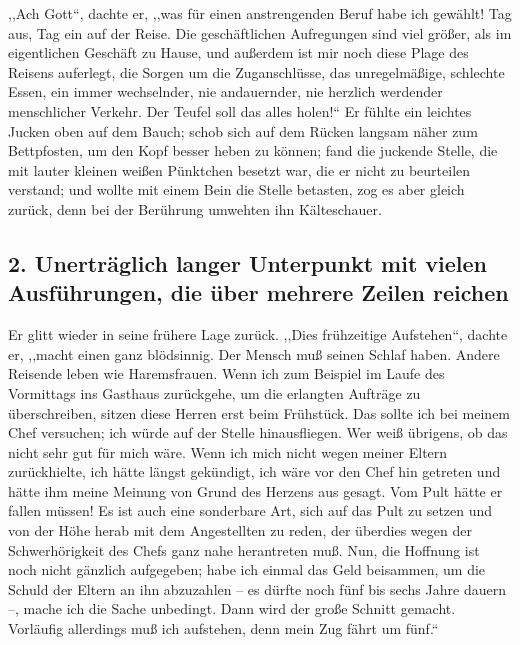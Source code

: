 \documentclass[]{zchinr}
\begin{document}
,,Ach Gott``, dachte er, ,,was für einen anstrengenden Beruf habe ich gewählt! Tag aus, Tag ein auf der Reise. Die geschäftlichen Aufregungen sind viel größer, als im eigentlichen Geschäft zu Hause, und außerdem ist mir noch diese Plage des Reisens auferlegt, die Sorgen um die Zuganschlüsse, das unregelmäßige, schlechte Essen, ein immer wechselnder, nie andauernder, nie herzlich werdender menschlicher Verkehr. Der Teufel soll das alles holen!`` Er fühlte ein leichtes Jucken oben auf dem Bauch; schob sich auf dem Rücken langsam näher zum Bettpfosten, um den Kopf besser heben zu können; fand die juckende Stelle, die mit lauter kleinen weißen Pünktchen besetzt war, die er nicht zu beurteilen verstand; und wollte mit einem Bein die Stelle betasten, zog es aber gleich zurück, denn bei der Berührung umwehten ihn Kälteschauer.

\subsection{2. Unerträglich langer Unterpunkt mit vielen Ausführungen, die über mehrere Zeilen reichen}

Er glitt wieder in seine frühere Lage zurück. ,,Dies frühzeitige Aufstehen``, dachte er, ,,macht einen ganz blödsinnig. Der Mensch muß seinen Schlaf haben. Andere Reisende leben wie Haremsfrauen. Wenn ich zum Beispiel im Laufe des Vormittags ins Gasthaus zurückgehe, um die erlangten Aufträge zu überschreiben, sitzen diese Herren erst beim Frühstück. Das sollte ich bei meinem Chef versuchen; ich würde auf der Stelle hinausfliegen. Wer weiß übrigens, ob das nicht sehr gut für mich wäre. Wenn ich mich nicht wegen meiner Eltern zurückhielte, ich hätte längst gekündigt, ich wäre vor den Chef hin getreten und hätte ihm meine Meinung von Grund des Herzens aus gesagt. Vom Pult hätte er fallen müssen! Es ist auch eine sonderbare Art, sich auf das Pult zu setzen und von der Höhe herab mit dem Angestellten zu reden, der überdies wegen der Schwerhörigkeit des Chefs ganz nahe herantreten muß. Nun, die Hoffnung ist noch nicht gänzlich aufgegeben; habe ich einmal das Geld beisammen, um die Schuld der Eltern an ihn abzuzahlen -- es dürfte noch fünf bis sechs Jahre dauern --, mache ich die Sache unbedingt. Dann wird der große Schnitt gemacht. Vorläufig allerdings muß ich aufstehen, denn mein Zug fährt um fünf.``
\end{document}
